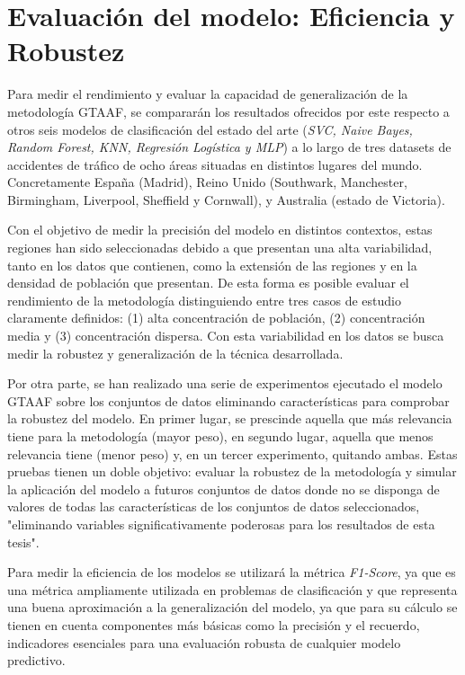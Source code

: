 \section{Evaluación del modelo: Eficiencia y Robustez}

Para medir el rendimiento y evaluar la capacidad de generalización de la metodología GTAAF, se compararán los resultados ofrecidos por este respecto a otros seis modelos de clasificación del estado del arte (\textit{SVC, Naive Bayes, Random Forest, KNN, Regresión Logística y MLP}) a lo largo de tres datasets de accidentes de tráfico de ocho áreas situadas en distintos lugares del mundo. Concretamente España (Madrid), Reino Unido (Southwark, Manchester, Birmingham, Liverpool, Sheffield y Cornwall), y Australia (estado de Victoria).

Con el objetivo de medir la precisión del modelo en distintos contextos, estas regiones han sido seleccionadas debido a que presentan una alta variabilidad, tanto en los datos que contienen, como la extensión de las regiones y en la densidad de población que presentan. De esta forma es posible evaluar el rendimiento de la metodología distinguiendo entre tres casos de estudio claramente definidos: (1) alta concentración de población, (2) concentración media y (3) concentración dispersa. Con esta variabilidad en los datos se busca medir la robustez y generalización de la técnica desarrollada.

Por otra parte, se han realizado una serie de experimentos ejecutado el modelo GTAAF sobre los conjuntos de datos eliminando características para comprobar la robustez del modelo. En primer lugar, se prescinde aquella que más relevancia tiene para la metodología (mayor peso), en segundo lugar, aquella que menos relevancia tiene (menor peso) y, en un tercer experimento, quitando ambas. Estas pruebas tienen un doble objetivo: evaluar la robustez de la metodología y simular la aplicación del modelo a futuros conjuntos de datos donde no se disponga de valores de todas las características de los conjuntos de datos seleccionados, "eliminando variables significativamente poderosas para los resultados de esta tesis".

Para medir la eficiencia de los modelos se utilizará la métrica \textit{F1-Score}, ya que es una métrica ampliamente utilizada en problemas de clasificación y que representa una buena aproximación a la generalización del modelo, ya que para su cálculo se tienen en cuenta componentes más básicas como la precisión y el recuerdo, indicadores esenciales para una evaluación robusta de cualquier modelo predictivo.
